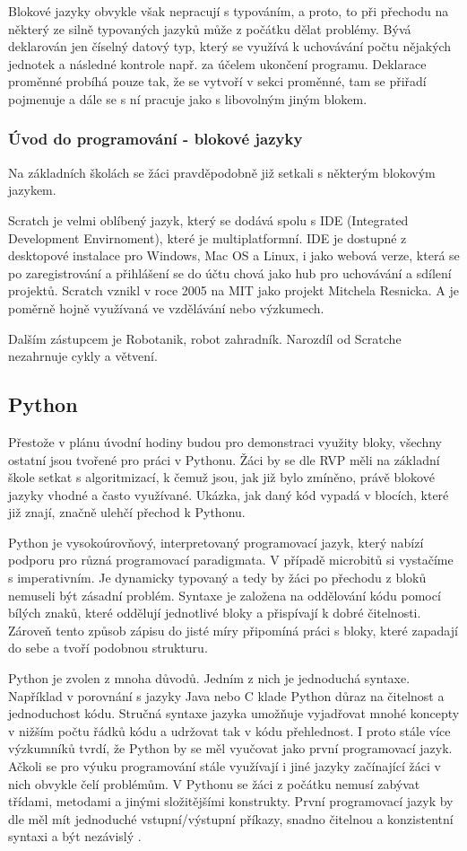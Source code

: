 \documentclass[
  digital,     %
  oneside,     %
  nosansbold,  %
  nocolorbold, %
  lof,         %
  lot,         %
]{fithesis4}
\begin{document}
Blokové jazyky obvykle však nepracují s typováním, a proto, to při přechodu na některý ze silně typovaných jazyků může z počátku dělat problémy. Bývá deklarován jen číselný datový typ, který se využívá k uchovávání počtu nějakých jednotek a následné kontrole např. za účelem ukončení programu. Deklarace proměnné probíhá pouze tak, že se vytvoří v sekci proměnné, tam se přiřadí pojmenuje a dále se s ní pracuje jako s libovolným jiným blokem.

\subsubsection{Úvod do programování - blokové jazyky}
Na základních školách se žáci pravděpodobně již setkali s některým blokovým jazykem.

Scratch je velmi oblíbený jazyk, který se dodává spolu s IDE (Integrated Development Envirnoment), které je multiplatformní. IDE je dostupné z desktopové instalace pro Windows, Mac OS a Linux, i jako webová verze, která se po zaregistrování a přihlášení se do účtu chová jako hub pro uchovávání a sdílení projektů. Scratch vznikl v roce 2005 na MIT jako projekt Mitchela Resnicka. A je poměrně hojně využívaná ve vzdělávání nebo výzkumech.

Dalším zástupcem je Robotanik, robot zahradník. Narozdíl od Scratche nezahrnuje cykly a větvení.

\subsection{Python}
Přestože v plánu úvodní hodiny budou pro demonstraci využity bloky, všechny ostatní jsou tvořené pro práci v Pythonu. Žáci by se dle RVP měli na základní škole setkat s algoritmizací, k čemuž jsou, jak již bylo zmíněno, právě blokové jazyky vhodné a často využívané. Ukázka, jak daný kód vypadá v blocích, které již znají, značně ulehčí přechod k Pythonu.

Python je vysokoúrovňový, interpretovaný programovací jazyk, který nabízí podporu pro různá programovací paradigmata. V případě microbitů si vystačíme s imperativním. Je dynamicky typovaný a tedy by žáci po přechodu z bloků nemuseli být zásadní problém. Syntaxe je založena na oddělování kódu pomocí bílých znaků, které oddělují jednotlivé bloky a přispívají k dobré čitelnosti. Zároveň tento způsob zápisu do jisté míry připomíná práci s bloky, které zapadají do sebe a tvoří podobnou strukturu.

Python je zvolen z mnoha důvodů. Jedním z nich je jednoduchá syntaxe. Například v porovnání s jazyky Java nebo C klade Python důraz na čitelnost a jednoduchost kódu. Stručná syntaxe jazyka umožňuje vyjadřovat mnohé koncepty v nižším počtu řádků kódu a udržovat tak v kódu přehlednost. I proto stále více výzkumníků tvrdí, že Python by se měl vyučovat jako první programovací jazyk. Ačkoli se pro výuku programování stále využívají i jiné jazyky začínající žáci v nich obvykle čelí problémům. V Pythonu se žáci z počátku nemusí zabývat třídami, metodami a jinými složitějšími konstrukty. První programovací jazyk by dle \textcite{Lo15} měl mít jednoduché vstupní/výstupní příkazy, snadno čitelnou a konzistentní syntaxi a být nezávislý \parencite{Lo15}.
\end{document}

